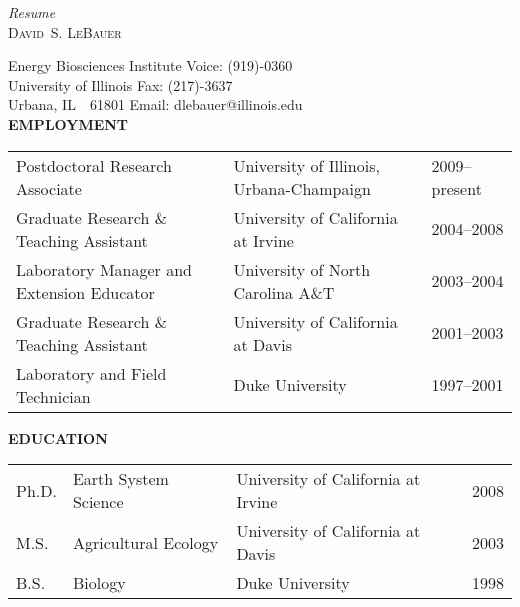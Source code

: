 \documentclass[11pt,twoside]{article}
\begin{document}
\setcounter{page}{1}
\pagestyle{fancy}
\chead{}
\rhead{\thepage}
\lfoot{}
\cfoot{}
\rfoot{}
\newcommand{\dslnote}{\csznote}
\thispagestyle{plain}

\begin{center}
{\textit{Resume}}\\
{\large\textsc{David~S. LeBauer}}\\
\end{center}

Energy Biosciences Institute \hfill Voice: (919)-0360\\
University of Illinois \hfill Fax: (217)-3637  \\
Urbana, IL~~61801 \hfill Email: dlebauer@illinois.edu\\

\medskip
\textbf{EMPLOYMENT}
\vspace{-0.5em}

\begin{table}[h]
\begin{tabular}{ >{\raggedright}p{18.0em}<{} >{\raggedright}p{20.0em}<{}l}
 Postdoctoral Research Associate& University of Illinois, Urbana-Champaign & 2009-- present\\ 
 Graduate Research \& Teaching Assistant& University of California at Irvine&2004--2008  \\ 
 Laboratory Manager and Extension Educator& University of North Carolina A\&T &2003--2004 \\
 Graduate Research \& Teaching Assistant& University of California at Davis  &2001--2003\\
 Laboratory and Field Technician& Duke University &1997--2001 \\
\end{tabular}
\end{table}

\vspace{-0.5em}

\textbf{EDUCATION}
\vspace{-0.5em}

\begin{table}[h]
\begin{tabular}{ >{\raggedright}p{2.0em}<{}  >{\raggedright}p{15.0em}<{} >{\raggedright}p{20.0em}<{}   l } 
Ph.D. & Earth System Science & University of California at Irvine & 2008\\
M.S. & Agricultural Ecology & University of California at Davis & 2003 \\
B.S. &Biology &  Duke University & 1998 \\
\end{tabular}
\end{table}
\vspace{-0.5em}
\end{document}
